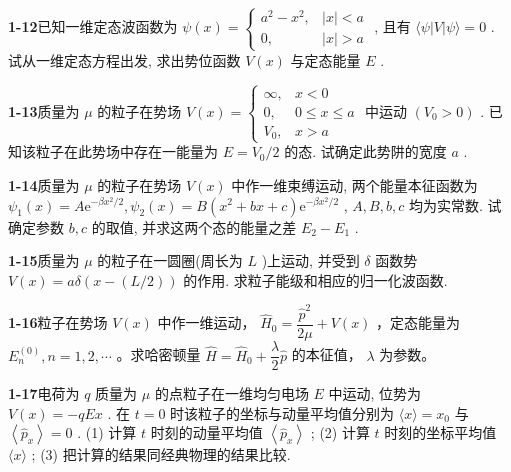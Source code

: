 \vfill

\newpage

\textbf{1-12}\quad 已知一维定态波函数为 $\displaystyle \psi(x) = \begin{cases} a^2 - x^2, & |x| < a \\ 0, & |x| > a \end{cases}$ , 且有 $\displaystyle \langle \psi | V | \psi \rangle = 0$ . 试从一维定态方程出发, 求出势位函数 $\displaystyle V(x)$ 与定态能量 $\displaystyle E$ .

\vfill

\newpage

\textbf{1-13}\quad 质量为 $\displaystyle \mu$ 的粒子在势场 $\displaystyle V(x) = \begin{cases} \infty, & x < 0 \\ 0, & 0 \leqslant x \leqslant a \\ V_0, & x > a \end{cases}$ 中运动 $\displaystyle (V_0 > 0)$ . 已知该粒子在此势场中存在一能量为 $\displaystyle E = V_0 / 2$ 的态. 试确定此势阱的宽度 $\displaystyle a$ .

\vfill

\newpage

\textbf{1-14}\quad 质量为 $\displaystyle \mu$ 的粒子在势场 $\displaystyle V(x)$ 中作一维束缚运动, 两个能量本征函数为 $\displaystyle \psi_{1}(x) = A\mathrm{e}^{-\beta x^{2} / 2}, \psi_{2}(x) = B(x^{2} + bx + c)\mathrm{e}^{-\beta x^{2} / 2}$ , $\displaystyle A, B, b, c$ 均为实常数. 试确定参数 $\displaystyle b, c$ 的取值, 并求这两个态的能量之差 $\displaystyle E_{2} - E_{1}$ .

\vfill

\newpage

\textbf{1-15}\quad 质量为 $\displaystyle \mu$ 的粒子在一圆圈(周长为 $\displaystyle L$ )上运动, 并受到 $\displaystyle \delta$ 函数势 $\displaystyle V(x) = a\delta (x - (L / 2))$ 的作用. 求粒子能级和相应的归一化波函数.

\vfill

\newpage

\textbf{1-16}\quad 粒子在势场 $\displaystyle V(x)$ 中作一维运动， $\displaystyle \hat{H}_{0}=\dfrac{\hat{p}^{2}}{2\mu}+V(x)$ ，定态能量为 $\displaystyle E_{n}^{(0)}, n=1,2,\cdots$ 。求哈密顿量 $\displaystyle \hat{H}=\hat{H}_{0}+\dfrac{\lambda}{2}\hat{p}$ 的本征值， $\displaystyle \lambda$ 为参数。

\vfill

\newpage

\textbf{1-17}\quad 电荷为 $\displaystyle q$ 质量为 $\displaystyle \mu$ 的点粒子在一维均匀电场 $\displaystyle E$ 中运动, 位势为 $\displaystyle V(x) = -qEx$ . 在 $\displaystyle t = 0$ 时该粒子的坐标与动量平均值分别为 $\displaystyle \langle x \rangle = x_0$ 与 $\displaystyle \left\langle \hat{p}_x \right\rangle = 0$ . (1) 计算 $\displaystyle t$ 时刻的动量平均值 $\displaystyle \left\langle \hat{p}_x \right\rangle$ ; (2) 计算 $\displaystyle t$ 时刻的坐标平均值 $\displaystyle \langle x \rangle$ ; (3) 把计算的结果同经典物理的结果比较.

